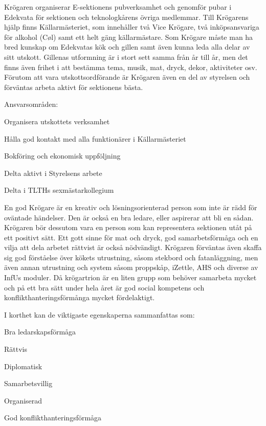 \documentclass[10pt]{article}
\def\post{Krögare}
\def\doctitle{Kravprofil för \post}
\begin{document}
\heading{\doctitle}

Krögaren organiserar E-sektionens pubverksamhet och genomför pubar i Edekvata för sektionen och teknologkårens övriga medlemmar. Till Krögarens hjälp finns Källarmästeriet, som innehåller två Vice Krögare, två inköpsansvariga för alkohol (Cøl) samt ett helt gäng källarmästare.
Som Krögare måste man ha bred kunskap om Edekvatas kök och gillen samt även kunna leda alla delar av sitt utskott. Gillenas utformning är i stort sett samma från år till år, men det finns även frihet i att bestämma tema, musik, mat, dryck, dekor, aktiviteter osv. 
Förutom att vara utskottsordförande är Krögaren även en del av styrelsen och förväntas arbeta aktivt för sektionens bästa. 

Ansvarsområden:
\begin{dashlist}
    \item Organisera utskottets verksamhet
    \item Hålla god kontakt med alla funktionärer i Källarmästeriet
    \item Bokföring och ekonomisk uppföljning
    \item Delta aktivt i Styrelsens arbete
    \item Delta i TLTHs sexmästarkollegium
\end{dashlist}

En god Krögare är en kreativ och lösningsorienterad person som inte är rädd för oväntade händelser. 
Den är också en bra ledare, eller aspirerar att bli en sådan. Krögaren bör dessutom vara en person som kan representera sektionen utåt på ett positivt sätt. 
Ett gott sinne för mat och dryck, god samarbetsförmåga och en vilja att dela arbetet rättvist är också nödvändigt. 
Krögaren förväntas även skaffa sig god förståelse över kökets utrustning, såsom stekbord och fatanläggning, men även annan utrustning och system såsom proppskåp, iZettle, AHS och diverse av InfUs moduler. Då krögartrion är en liten grupp som behöver samarbeta mycket och på ett bra sätt under hela året är god social kompetens och konflikthanteringsförmånga mycket fördelaktigt.

I korthet kan de viktigaste egenskaperna sammanfattas som:
\begin{dashlist}
    \item Bra ledarskapsförmåga
    \item Rättvis
    \item Diplomatisk
    \item Samarbetsvillig
    \item Organiserad
    \item God konflikthanteringsförmåga 
\end{dashlist}
\end{document}
